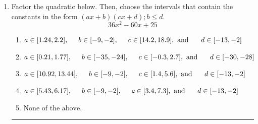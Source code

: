 \documentclass[14pt]{extbook}
\newcommand{\litem}[1]{\item#1\hspace*{-1cm}\rule{\textwidth}{0.4pt}}
\begin{document}
\begin{enumerate}
{\begin{enumerate}[label=\Alph*.]
\end{enumerate} }
\litem{
Factor the quadratic below. Then, choose the intervals that contain the constants in the form $(ax+b)(cx+d); b \leq d.$\[ 36x^{2} -60 x + 25 \]\begin{enumerate}[label=\Alph*.]
\item \( a \in [1.24, 2.2], \hspace*{5mm} b \in [-9, -2], \hspace*{5mm} c \in [14.2, 18.9], \text{ and } \hspace*{5mm} d \in [-13, -2] \)
\item \( a \in [0.21, 1.77], \hspace*{5mm} b \in [-35, -24], \hspace*{5mm} c \in [-0.3, 2.7], \text{ and } \hspace*{5mm} d \in [-30, -28] \)
\item \( a \in [10.92, 13.44], \hspace*{5mm} b \in [-9, -2], \hspace*{5mm} c \in [1.4, 5.6], \text{ and } \hspace*{5mm} d \in [-13, -2] \)
\item \( a \in [5.43, 6.17], \hspace*{5mm} b \in [-9, -2], \hspace*{5mm} c \in [3.4, 7.3], \text{ and } \hspace*{5mm} d \in [-13, -2] \)
\item \( \text{None of the above.} \)

\end{enumerate} }
\end{enumerate}
\end{document}
